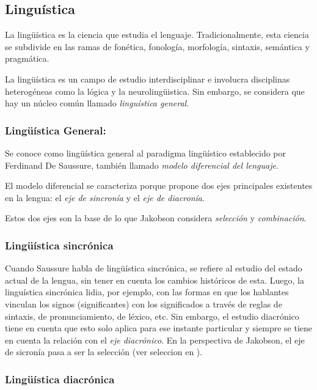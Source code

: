 \documentclass[12pt,letterpaper,twoside]{article}
\begin{document}
\subsection{Linguística}
\label{sec:orgaa8a326}

La lingüística es la ciencia que estudia el lenguaje.
Tradicionalmente, esta ciencia se subdivide en las ramas de fonética,
fonología, morfología, sintaxis, semántica y pragmática. \cite{gelbukh2004}

La lingüística es un campo de estudio interdisciplinar e involucra
disciplinas heterogéneas como la lógica y la neurolingüistica. Sin
embargo, se considera que hay un núcleo común llamado \emph{linguística
general}.

\subsubsection{Lingüística General:}
\label{sec:org9617945}

Se conoce como lingüística general al paradigma lingüístico
establecido por Ferdinand De Saussure, también llamado \emph{modelo
diferencial del lenguaje}.

El modelo diferencial se caracteriza porque propone dos ejes
principales existentes en la lengua: el \emph{eje de sincronía} y el
\emph{eje de diacronía}.\cite{alonso1945curso}

Estos dos ejes son la base de lo que Jakobson considera \emph{selección} y
\emph{combinación}.


\subsubsection{Lingüística sincrónica}
\label{sec:orgd28e7a5}

Cuando Saussure habla de lingüística sincrónica, se refiere al
estudio del estado actual de la lengua, sin tener en cuenta los
cambios históricos de esta. Luego, la linguística sincrónica lidia,
por ejemplo, con las formas en que los hablantes vinculan los
signos (significantes) con los significados a través de reglas de
sintaxis, de pronunciamiento, de léxico, etc. Sin embargo, el
estudio diacrónico tiene en cuenta que esto solo aplica para
ese instante particular y siempre se tiene en cuenta la relación
con el \emph{eje diacrónico}. En la perspectiva de Jakobson, el eje de
sicronía pasa a ser la selección (ver seleccion en ).

\subsubsection{Lingüística diacrónica}
\label{sec:org972b810}
\end{document}
